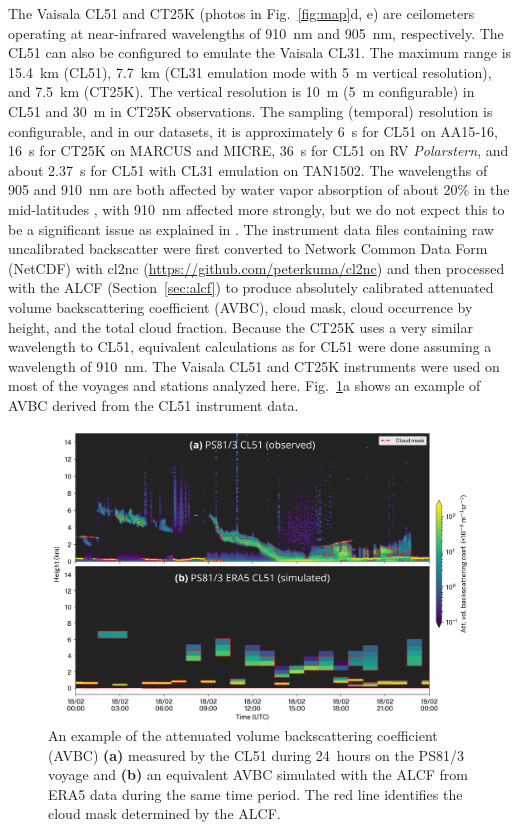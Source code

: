 \documentclass[draft]{agujournal2019}
\begin{document}
The Vaisala CL51 and CT25K (photos in Fig.~\ref{fig:map}d, e) are ceilometers operating at near-infrared wavelengths of 910~nm and 905~nm, respectively. The CL51 can also be configured to emulate the Vaisala CL31. The maximum range is 15.4~km (CL51), 7.7~km (CL31 emulation mode with 5~m vertical resolution), and 7.5~km (CT25K). The vertical resolution is 10~m (5~m configurable) in CL51 and 30~m in CT25K observations. The sampling (temporal) resolution is configurable, and in our datasets, it is approximately 6~s for CL51 on AA15‐16, 16~s for CT25K on MARCUS and MICRE, 36~s for CL51 on RV \emph{Polarstern}, and about 2.37~s for CL51 with CL31 emulation on TAN1502. The wavelengths of 905 and 910~nm are both affected by water vapor absorption of about 20\% in the mid-latitudes \cite{wiegner2015,wiegner2019}, with 910~nm affected more strongly, but we do not expect this to be a significant issue as explained in . The instrument data files containing raw uncalibrated backscatter were first converted to Network Common Data Form (NetCDF) with cl2nc (\url{https://github.com/peterkuma/cl2nc}) and then processed with the ALCF (Section~\ref{sec:alcf}) to produce absolutely calibrated attenuated volume backscattering coefficient (AVBC), cloud mask, cloud occurrence by height, and the total cloud fraction. Because the CT25K uses a very similar wavelength to CL51, equivalent calculations as for CL51 were done assuming a wavelength of 910~nm. The Vaisala CL51 and CT25K instruments were used on most of the voyages and stations analyzed here. Fig.~\ref{fig:example}a shows an example of AVBC derived from the CL51 instrument data.

\begin{figure}[b!]
\centering
\includegraphics[width=\textwidth]{img/example.png}
\caption{
An example of the attenuated volume backscattering coefficient (AVBC) \textbf{(a)} measured by the CL51 during 24~hours on the PS81/3 voyage and \textbf{(b)} an equivalent AVBC simulated with the ALCF from ERA5 data during the same time period. The red line identifies the cloud mask determined by the ALCF.
}
\label{fig:example}
\end{figure}
\end{document}
